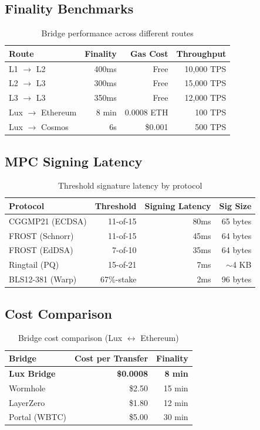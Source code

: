 \documentclass[11pt]{article}
\begin{document}
\subsection{Finality Benchmarks}

\begin{table}[h]
\centering
\begin{tabular}{lrrr}
\toprule
Route & Finality & Gas Cost & Throughput \\
\midrule
L1 $\to$ L2 & 400ms & Free & 10,000 TPS \\
L2 $\to$ L3 & 300ms & Free & 15,000 TPS \\
L3 $\to$ L3 & 350ms & Free & 12,000 TPS \\
Lux $\to$ Ethereum & 8 min & 0.0008 ETH & 100 TPS \\
Lux $\to$ Cosmos & 6s & \$0.001 & 500 TPS \\
\bottomrule
\end{tabular}
\caption{Bridge performance across different routes}
\end{table}

\subsection{MPC Signing Latency}

\begin{table}[h]
\centering
\begin{tabular}{lrrr}
\toprule
\textbf{Protocol} & \textbf{Threshold} & \textbf{Signing Latency} & \textbf{Sig Size} \\
\midrule
CGGMP21 (ECDSA) & 11-of-15 & 80ms & 65 bytes \\
FROST (Schnorr) & 11-of-15 & 45ms & 64 bytes \\
FROST (EdDSA) & 7-of-10 & 35ms & 64 bytes \\
Ringtail (PQ) & 15-of-21 & 7ms & $\sim$4 KB \\
BLS12-381 (Warp) & 67\%-stake & 2ms & 96 bytes \\
\bottomrule
\end{tabular}
\caption{Threshold signature latency by protocol}
\end{table}

\subsection{Cost Comparison}

\begin{table}[h]
\centering
\begin{tabular}{lrr}
\toprule
Bridge & Cost per Transfer & Finality \\
\midrule
\textbf{Lux Bridge} & \textbf{\$0.0008} & \textbf{8 min} \\
Wormhole & \$2.50 & 15 min \\
LayerZero & \$1.80 & 12 min \\
Portal (WBTC) & \$5.00 & 30 min \\
\bottomrule
\end{tabular}
\caption{Bridge cost comparison (Lux $\leftrightarrow$ Ethereum)}
\end{table}
\end{document}
